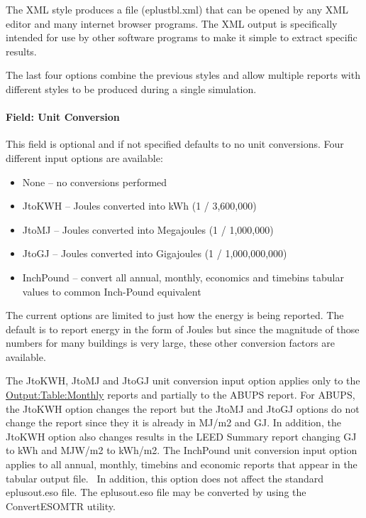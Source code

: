 The XML style produces a file (eplustbl.xml) that can be opened by any XML editor and many internet browser programs. The XML output is specifically intended for use by other software programs to make it simple to extract specific results.

The last four options combine the previous styles and allow multiple reports with different styles to be produced during a single simulation.

\paragraph{Field: Unit Conversion}\label{field-unit-conversion}

This field is optional and if not specified defaults to no unit conversions. Four different input options are available:

\begin{itemize}
\item
  None -- no conversions performed
\item
  JtoKWH -- Joules converted into kWh (1 / 3,600,000)
\item
  JtoMJ -- Joules converted into Megajoules (1 / 1,000,000)
\item
  JtoGJ -- Joules converted into Gigajoules (1 / 1,000,000,000)
\item
  InchPound -- convert all annual, monthly, economics and timebins tabular values to common Inch-Pound equivalent
\end{itemize}

The current options are limited to just how the energy is being reported. The default is to report energy in the form of Joules but since the magnitude of those numbers for many buildings is very large, these other conversion factors are available.

The JtoKWH, JtoMJ and JtoGJ unit conversion input option applies only to the \hyperref[outputtablemonthly]{Output:Table:Monthly} reports and partially to the ABUPS report. For ABUPS, the JtoKWH option changes the report but the JtoMJ and JtoGJ options do not change the report since they it is already in MJ/m2 and GJ. In addition, the JtoKWH option also changes results in the LEED Summary report changing GJ to kWh and MJW/m2 to kWh/m2. The InchPound unit conversion input option applies to all annual, monthly, timebins and economic reports that appear in the tabular output file.~ In addition, this option does not affect the standard eplusout.eso file. The eplusout.eso file may be converted by using the ConvertESOMTR utility.

